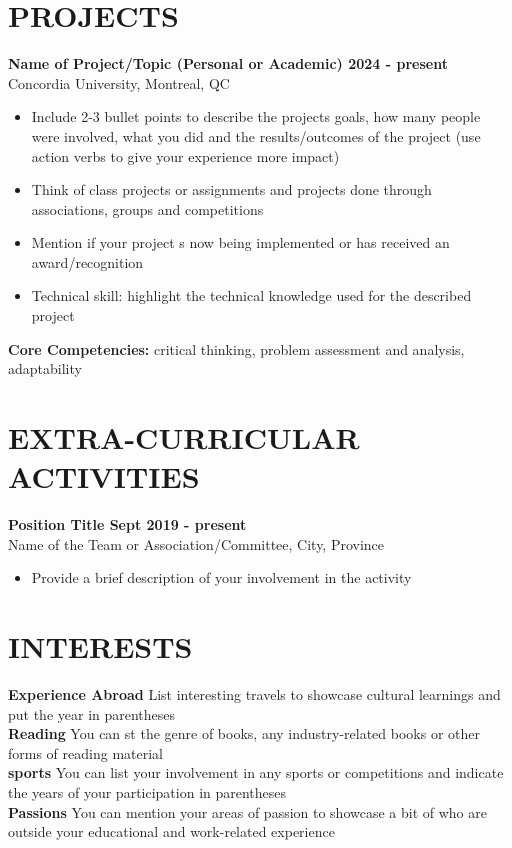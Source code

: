 \documentclass[a4paper,10pt]{article}
\begin{document}
\section*{PROJECTS}

\textbf{Name of Project/Topic (Personal or Academic) \hfill 2024 - present } \\
Concordia University, Montreal, QC
\vspace{-0.5em}
\begin{itemize}[noitemsep]
  \item Include 2-3 bullet points to describe the projects goals, 
    how many people were involved, what you did and the results/outcomes of the
    project (use action verbs to give your experience more impact)
  \item Think of class projects or assignments and projects done through 
    associations, groups and competitions
  \item Mention if your project s now being implemented or has 
    received an award/recognition
  \item Technical skill: highlight the technical knowledge used for the described project
\end{itemize}
\vspace{-0.5em}
\textbf{Core Competencies:} critical thinking, problem assessment and analysis, adaptability

\section*{EXTRA-CURRICULAR ACTIVITIES}

\textbf{Position Title \hfill Sept 2019 - present} \\
Name of the Team or Association/Committee, City, Province
\vspace{-0.5em}
\begin{itemize}[noitemsep]
  \item Provide a brief description of your involvement in the activity
\end{itemize}

\pagebreak
\section*{INTERESTS}
\textbf{Experience Abroad} List interesting travels to showcase cultural learnings 
and put the year in parentheses\\
\textbf{Reading} You can st the genre of books, any industry-related books or other forms of
reading material\\
\textbf{sports} You can list your involvement in any sports or competitions and indicate the years
of your participation in parentheses\\
\textbf{Passions} You can mention your areas of passion to showcase a 
bit of who are outside your educational and work-related experience
\end{document}
